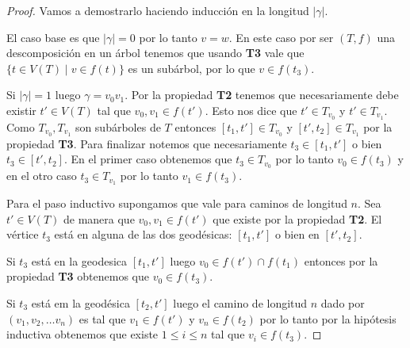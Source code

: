 \documentclass[tesis.tex]{subfiles}
\begin{document}
\begin{proof}	
	Vamos a demostrarlo haciendo inducción en la longitud $|\gamma|$.
	 
	El caso base es que $|\gamma| = 0$ por lo tanto $v=w$. 
	En este caso por ser $(T,f)$ una descomposición en un árbol tenemos que usando \textbf{T3} vale que $\{  t \in V(T) \mid v \in f(t) \}$ es un subárbol, por lo que $v \in f(t_{3})$.
	
	Si $|\gamma| = 1$ luego $\gamma = v_{0}v_{1}$.
	Por la propiedad \textbf{T2} tenemos que necesariamente debe existir $t' \in V(T)$ tal que 
	$v_{0}, v_{1} \in f(t')$.
	Esto nos dice que $t' \in T_{v_{0}}$ y $t' \in T_{v_{1}}$. 
	Como $T_{v_{0}}, T_{v_{1}}$ son subárboles de $T$ entonces 
	$[t_{1}, t'] \in T_{v_{0}}$ y $[t', t_{2}] \in T_{v_{1}}$ por la propiedad \textbf{T3}.
	Para finalizar notemos que necesariamente $t_{3} \in [t_{1},t']$ o bien $t_{3} \in [t',t_{2}]$.
	En el primer caso obtenemos que $t_{3} \in T_{v_{0}}$ por lo tanto $v_{0} \in f(t_{3})$ y en el otro caso $t_{3} \in T_{v_{1}}$ por lo tanto $v_{1} \in f(t_{3})$.


	Para el paso inductivo supongamos que vale para caminos de longitud $n$.
	Sea $t' \in V(T)$ de manera que $v_{0}, v_{1} \in f(t')$ que existe por la propiedad \textbf{T2}.
	El vértice $t_{3}$ está en alguna de las dos geodésicas: $[t_{1},t']$ o bien en $[t',t_{2}]$.
	
	Si $t_{3}$ está en la geodesica $[t_{1},t']$ luego $v_{0} \in f(t') \cap f(t_{1})$ entonces por la propiedad \textbf{T3} obtenemos que $v_{0} \in f(t_{3})$. 

	Si $t_{3}$ está em la geodésica $[t_{2},t']$ luego el camino de longitud $n$ dado por $(v_1, v_2, \dots v_n)$ es tal que $v_{1} \in f(t')$ y $v_{n} \in f(t_{2})$ por lo tanto por la hipótesis inductiva obtenemos que existe $1 \le i \le n$ tal que $v_{i} \in f(t_{3})$.

\end{proof}
\end{document}
